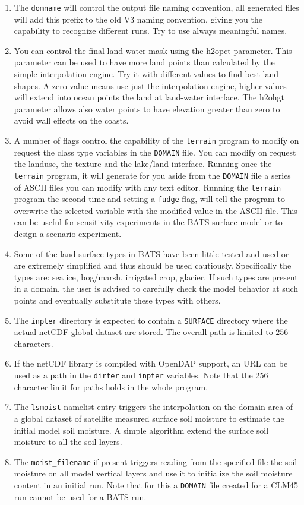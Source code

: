 \begin{enumerate}
\item The \verb=domname= will control the output file naming convention, all
generated files will add this prefix to the old V3 naming convention,
giving you the capability to recognize different runs. Try to use always
meaningful names.
\item You can control the final land-water mask using the h2opct parameter.
This parameter can be used to have more land points than calculated by
the simple interpolation engine. Try it with different values to find best
land shapes. A zero value means use just the interpolation engine, higher
values will extend into ocean points the land at land-water interface.
The h2ohgt parameter allows also water points to have elevation greater
than zero to avoid wall effects on the coasts.
\item A number of flags control the capability of the \verb=terrain= program
to modify on request the class type variables in the \verb=DOMAIN= file. You can
modify on request the landuse, the texture and the lake/land interface.
Running once the \verb=terrain= program, it will generate for you aside from the
\verb=DOMAIN= file a series of ASCII files you can modify with any text
editor. Running the \verb=terrain= program the second time and setting
a \verb=fudge= flag, will tell the program to overwrite the selected
variable with the modified value in the ASCII file. This can be useful
for sensitivity experiments in the BATS surface model or to design
a scenario experiment.
\item Some of the land surface types in BATS have been little tested and used
or are extremely simplified and thus should be used cautiously. Specifically
the types are: sea ice, bog/marsh, irrigated crop, glacier. If such types are
present in a domain, the user is advised to carefully check the model behavior
at such points and eventually substitute these types with others.
\item The \verb=inpter= directory is expected to contain a \verb=SURFACE=
directory where the actual netCDF global dataset are stored. The overall
path is limited to $256$ characters.
\label{pathnote}
\item If the netCDF library is compiled with OpenDAP support, an URL
can be used as a path in the \verb=dirter= and \verb=inpter= variables.
Note that the $256$ character limit for paths holds in the whole program.
\item The \verb=lsmoist= namelist entry triggers the interpolation on the
domain area of a global dataset of satellite measured surface soil moisture
to estimate the initial model soil moisture. A simple algorithm extend the
surface soil moisture to all the soil layers.
\item The \verb=moist_filename= if present triggers reading from the
specified file the soil moisture on all model vertical layers and use it to
initialize the soil moisture content in an initial run. Note that for this
a \verb=DOMAIN= file created for a CLM45 run cannot be used for a BATS run.
\end{enumerate}

